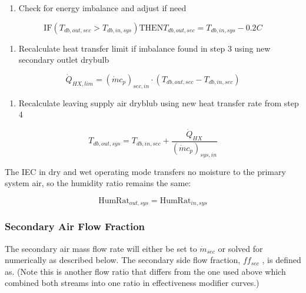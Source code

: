 \begin{enumerate}
\def\labelenumi{\arabic{enumi}.}
\setcounter{enumi}{2}
\tightlist
\item
  Check for energy imbalance and adjust if need
\end{enumerate}

\begin{equation}
\text{IF} \left(T_{db,out,sec}>T_{db,in,sys}\right) \text{THEN} T_{db,out,sec} = T_{db,in,sys}-0.2 C
\end{equation}

\begin{enumerate}
\def\labelenumi{\arabic{enumi}.}
\setcounter{enumi}{3}
\tightlist
\item
  Recalculate heat transfer limit if imbalance found in step 3 using new secondary outlet drybulb
\end{enumerate}

\begin{equation}
\dot{Q}_{HX,lim} = \left(\dot{m}c_{p}\right)_{sec,in}\cdot \left( T_{db,out,sec}-T_{db,in,sec} \right)
\end{equation}

\begin{enumerate}
\def\labelenumi{\arabic{enumi}.}
\setcounter{enumi}{4}
\tightlist
\item
  Recalculate leaving supply air dryblub using new heat transfer rate from step 4
\end{enumerate}

\begin{equation}
T_{db,out,sys} = T_{db,in,sec} + \frac{\dot{Q}_{HX}}{ \left(\dot{m}c_{p}\right)_{sys,in}}
\end{equation}

The IEC in dry and wet operating mode transfers no moisture to the primary system air, so the humidity ratio remains the same:

\begin{equation}
\text{HumRat}_{out,sys} = \text{HumRat}_{in,sys}
\end{equation}

\subsubsection{Secondary Air Flow Fraction}\label{secondary-air-flow-fraction}

The secondary air mass flow rate will either be set to \(\dot{m}_{sec}\) or solved for numerically as described below. The secondary side flow fraction, \(ff_{sec}\) , is defined as. (Note this is another flow ratio that differs from the one used above which combined both streams into one ratio in effectiveness modifier curves.)

